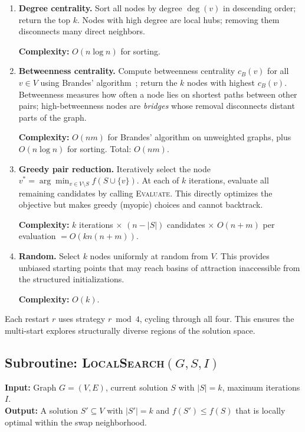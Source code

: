 \documentclass[11pt,a4paper]{article}
\begin{document}
\begin{enumerate}
    \item \textbf{Degree centrality.} Sort all nodes by degree $\deg(v)$ in descending order; return the top $k$. Nodes with high degree are local hubs; removing them disconnects many direct neighbors.

    \textbf{Complexity:} $O(n \log n)$ for sorting.

    \item \textbf{Betweenness centrality.} Compute betweenness centrality $c_B(v)$ for all $v \in V$ using Brandes' algorithm~\cite{brandes2001}; return the $k$ nodes with highest $c_B(v)$. Betweenness measures how often a node lies on shortest paths between other pairs; high-betweenness nodes are \emph{bridges} whose removal disconnects distant parts of the graph.

    \textbf{Complexity:} $O(nm)$ for Brandes' algorithm on unweighted graphs, plus $O(n \log n)$ for sorting. Total: $O(nm)$.

    \item \textbf{Greedy pair reduction.} Iteratively select the node $v^* = \arg\min_{v \in V \setminus S} f(S \cup \{v\})$. At each of $k$ iterations, evaluate all remaining candidates by calling \textsc{Evaluate}. This directly optimizes the objective but makes greedy (myopic) choices and cannot backtrack.

    \textbf{Complexity:} $k$ iterations $\times$ $(n - |S|)$ candidates $\times$ $O(n+m)$ per evaluation $= O(kn(n+m))$.

    \item \textbf{Random.} Select $k$ nodes uniformly at random from $V$. This provides unbiased starting points that may reach basins of attraction inaccessible from the structured initializations.

    \textbf{Complexity:} $O(k)$.
\end{enumerate}

Each restart $r$ uses strategy $r \bmod 4$, cycling through all four. This ensures the multi-start explores structurally diverse regions of the solution space.

\subsection{Subroutine: \textsc{LocalSearch}$(G, S, I)$}

\textbf{Input:} Graph $G = (V, E)$, current solution $S$ with $|S| = k$, maximum iterations $I$.\\
\textbf{Output:} A solution $S' \subseteq V$ with $|S'| = k$ and $f(S') \leq f(S)$ that is locally optimal within the swap neighborhood.
\end{document}
